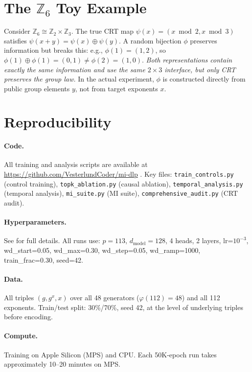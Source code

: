 \documentclass[11pt,a4paper]{article}
\theoremstyle{definition}
\theoremstyle{remark}
\newcommand{\Z}{\mathbb{Z}}
\begin{document}
\section{The $\Z_6$ Toy Example}

Consider $\Z_6 \cong \Z_2 \times \Z_3$. The true CRT map $\psi(x) = (x \bmod 2, x \bmod 3)$ satisfies $\psi(x+y) = \psi(x) \oplus \psi(y)$. A random bijection $\phi$ preserves information but breaks this: e.g., $\phi(1) = (1,2)$, so $\phi(1) \oplus \phi(1) = (0,1) \neq \phi(2) = (1,0)$. \emph{Both representations contain exactly the same information and use the same $2 \times 3$ interface, but only CRT preserves the group law.} In the actual experiment, $\phi$ is constructed directly from public group elements $y$, not from target exponents $x$.

\section{Reproducibility}

\paragraph{Code.} All training and analysis scripts are available at \url{https://github.com/VesterlundCoder/mi-dlp} \citep{vesterlund2026mi_dlp_repo}. Key files: \texttt{train\_controls.py} (control training), \texttt{topk\_ablation.py} (causal ablation), \texttt{temporal\_analysis.py} (temporal analysis), \texttt{mi\_suite.py} (MI suite), \texttt{comprehensive\_audit.py} (CRT audit).

\paragraph{Hyperparameters.} See  for full details. All runs use: $p=113$, $d_{\mathrm{model}}=128$, 4 heads, 2 layers, lr=$10^{-3}$, wd\_start=0.05, wd\_max=0.30, wd\_step=0.05, wd\_ramp=1000, train\_frac=0.30, seed=42.

\paragraph{Data.} All triples $(g, g^x, x)$ over all 48 generators ($\varphi(112)=48$) and all 112 exponents. Train/test split: 30\%/70\%, seed 42, at the level of underlying triples before encoding.

\paragraph{Compute.} Training on Apple Silicon (MPS) and CPU. Each 50K-epoch run takes approximately 10--20 minutes on MPS.
\end{document}
